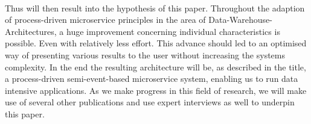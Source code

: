 \\
Thus will then result into the hypothesis of this paper. Throughout the adaption of process-driven microservice principles in the area of Data-Warehouse-Architectures, a huge improvement concerning individual characteristics is possible. Even with relatively less effort. This advance should led to an optimised way of presenting various results to the user without increasing the systems complexity.\newline 
In the end the resulting architecture will be, as described in the title, a process-driven semi-event-based microservice system, enabling us to run data intensive applications. \newline
As we make progress in this field of research, we will make use of several other publications and use expert interviews as well to underpin this paper. 